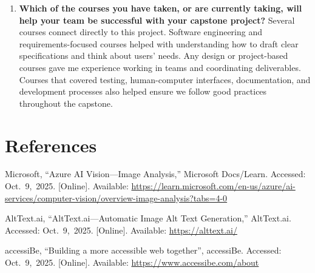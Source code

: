 \documentclass[12pt]{article}
\begin{document}
\begin{enumerate}
  \item \textbf{Which of the courses you have taken, or are currently
      taking, will help your team be successful with your capstone
    project?} \newline
    Several courses connect directly to this project. Software
    engineering and requirements-focused courses helped with
    understanding how to draft clear specifications and think about
    users' needs. Any design or project-based courses gave me
    experience working in teams and coordinating deliverables.
    Courses that covered testing, human-computer interfaces,
    documentation, and development
    processes also helped ensure we follow good practices
    throughout the capstone.
\end{enumerate}

\newpage
\section*{References}

\begin{hangparas}{2em}{1}
  Microsoft, ``Azure AI Vision---Image Analysis,'' Microsoft Docs/Learn.
  Accessed: Oct.~9,~2025. [Online]. Available:
  \url{https://learn.microsoft.com/en-us/azure/ai-services/computer-vision/overview-image-analysis?tabs=4-0}
  \\
  \par
  AltText.ai, ``AltText.ai---Automatic Image Alt Text Generation,'' AltText.ai.
  Accessed: Oct.~9,~2025. [Online]. Available: \url{https://alttext.ai/}
  \\
  \par
  accessiBe, ``Building a more accessible web together'', accessiBe.
  Accessed: Oct.~9,~2025. [Online]. Available:
  \url{https://www.accessibe.com/about}
\end{hangparas}
\end{document}
